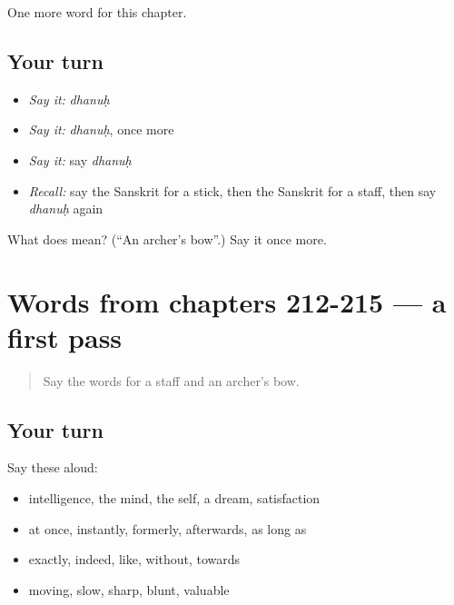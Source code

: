 \begin{grammarlens}[title={What you've built}]
One more word for this chapter.
\end{grammarlens}

\subsection*{Your turn}
\begin{itemize}
\raggedright
  \item \emph{Say it:} \emph{dhanuḥ}
  \item \emph{Say it:} \emph{dhanuḥ}, once more
  \item \emph{Say it:} say \emph{dhanuḥ}
  \item \emph{Recall:} say the Sanskrit for a stick, then the Sanskrit for a staff, then say \emph{dhanuḥ} again
\end{itemize}

\begin{tcolorbox}[breakable,colback=teal!4,colframe=teal!35!black,title={Before you move on}]
What does  mean? (\textquotedblleft{}An archer's bow\textquotedblright{}.) Say it once more.
\end{tcolorbox}
\section[(dialogue)]{Words from chapters 212-215 — a first pass}

\label{lesson:SA-R220-first-pass-words-from-chapters-212-215}



\begin{quote}
Say the words for a staff and an archer's bow.
\end{quote}

\subsection*{Your turn}
Say these aloud:

\begin{itemize}
\raggedright
  \item intelligence, the mind, the self, a dream, satisfaction
  \item at once, instantly, formerly, afterwards, as long as
  \item exactly, indeed, like, without, towards
  \item moving, slow, sharp, blunt, valuable
\end{itemize}

